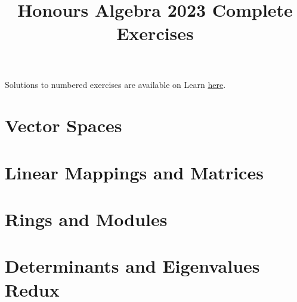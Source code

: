 \documentclass[a4paper]{article}
\title{Honours Algebra 2023 Complete Exercises}
\begin{document}
\maketitle

Solutions to numbered exercises are available on Learn \href{https://www.learn.ed.ac.uk/bbcswebdav/pid-8338476-dt-content-rid-33823325_1/xid-33823325_1}{here}.

\begin{enumerate}
  \section{Vector Spaces}
    
    
    
    
    
    

  \newpage
  \section{Linear Mappings and Matrices}
    
    
    
    

  \newpage
  \section{Rings and Modules}
    
    
    
    
    
    
    

  \newpage
  \section{Determinants and Eigenvalues Redux}
    
    
    
    
\end{enumerate}
\end{document}
